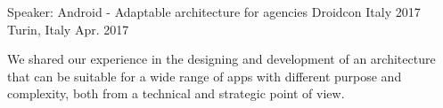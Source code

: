 


\begin{cventries}


\cventry
{Speaker: Android - Adaptable architecture for agencies} %
{Droidcon Italy 2017} %
{Turin, Italy} %
{Apr. 2017} %
{ %
	\begin{cvitems}
		\item {We shared our experience in the designing and development of an architecture that can be suitable for a wide range of apps with different purpose and complexity, both from a technical and strategic point of view.}
	\end{cvitems}
}


\end{cventries}